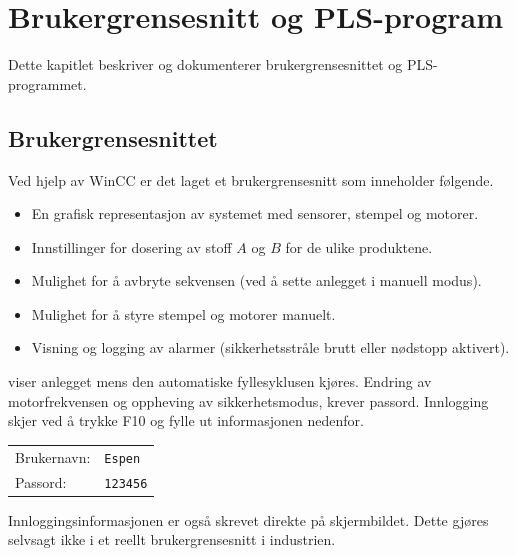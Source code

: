 \documentclass[Visionprosjekt.tex]{subfiles}
\begin{document}
\section{Brukergrensesnitt og PLS-program}

Dette kapitlet beskriver og dokumenterer brukergrensesnittet og PLS-programmet.



\subsection{Brukergrensesnittet}
Ved hjelp av WinCC er det laget et brukergrensesnitt som inneholder følgende.

\begin{itemize}
    \item En grafisk representasjon av systemet med  sensorer, stempel og motorer.
	\item Innstillinger for dosering av stoff $A$ og $B$ for de ulike produktene.
    \item Mulighet for å avbryte sekvensen (ved å sette anlegget i manuell modus).
    \item Mulighet for å styre stempel og motorer manuelt.
    \item Visning og logging av alarmer (sikkerhetsstråle brutt eller nødstopp aktivert).
\end{itemize}



  viser anlegget mens den automatiske fyllesyklusen kjøres.
Endring av motorfrekvensen og oppheving av sikkerhetsmodus, krever passord. Innlogging skjer ved å trykke F10 og fylle ut informasjonen nedenfor.

\begin{center}
    \begin{tabular}{ll}
        Brukernavn: & \texttt{Espen}\\
        Passord: & \texttt{123456}
    \end{tabular}
\end{center}

Innloggingsinformasjonen er også skrevet direkte på skjermbildet. Dette gjøres selvsagt ikke i et reellt brukergrensesnitt i industrien.
\end{document}
